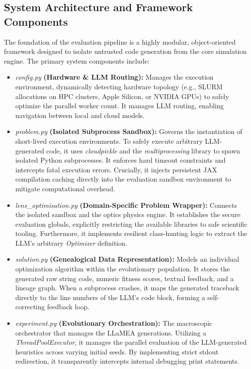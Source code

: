 \documentclass[12pt]{article}
\begin{document}
\subsection{System Architecture and Framework Components}
The foundation of the evaluation pipeline is a highly modular, object-oriented framework designed to isolate untrusted code generation from the core simulation engine. The primary system components include:
\begin{itemize}
    \item \textit{config.py} \textbf{(Hardware \& LLM Routing):} Manages the execution environment, dynamically detecting hardware topology (e.g., SLURM allocations on HPC clusters, Apple Silicon, or NVIDIA GPUs) to safely optimize the parallel worker count. It manages LLM routing, enabling navigation between local and cloud models.
    \item \textit{problem.py} \textbf{(Isolated Subprocess Sandbox):} Governs the instantiation of short-lived execution environments. To safely execute arbitrary LLM-generated code, it uses \textit{cloudpickle} and the \textit{multiprocessing} library to spawn isolated Python subprocesses. It enforces hard timeout constraints and intercepts fatal execution errors. Crucially, it injects persistent JAX compilation caching directly into the evaluation sandbox environment to mitigate computational overhead.
    \item \textit{lens\_optimisation.py} \textbf{(Domain-Specific Problem Wrapper):} Connects the isolated sandbox and the optics physics engine. It establishes the secure evaluation globals, explicitly restricting the available libraries to safe scientific tooling. Furthermore, it implements resilient class-hunting logic to extract the LLM's arbitrary \textit{Optimizer} definition.
    \item \textit{solution.py} \textbf{(Genealogical Data Representation):} Models an individual optimization algorithm within the evolutionary population. It stores the generated raw string code, numeric fitness scores, textual feedback, and a lineage graph. When a subprocess crashes, it maps the generated traceback directly to the line numbers of the LLM's code block, forming a self-correcting feedback loop.
    \item \textit{experiment.py} \textbf{(Evolutionary Orchestration):} The macroscopic orchestrator that manages the LLaMEA generations. Utilizing a \textit{ThreadPoolExecutor}, it manages the parallel evaluation of the LLM-generated heuristics across varying initial seeds. By implementing strict stdout redirection, it transparently intercepts internal debugging print statements.
\end{itemize}
\end{document}
